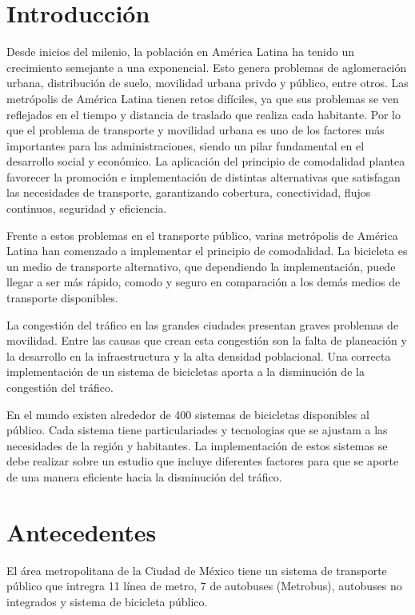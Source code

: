 \section{Introducción}

Desde inicios del milenio, la población en América Latina ha tenido un crecimiento semejante a una exponencial\cite{CEPAL_2015}. Esto genera problemas de aglomeración urbana, distribución de suelo, movilidad urbana privdo y público, entre otros. Las metrópolis de América Latina tienen retos difíciles, ya que sus problemas se ven reflejados en el tiempo y distancia de traslado que realiza cada habitante\cite{hall_1978}. Por lo que el problema de transporte y movilidad urbana es uno de los factores más importantes para las administraciones, siendo un pilar fundamental en el desarrollo social y económico. La aplicación del principio de comodalidad plantea favorecer la promoción e implementación de distintas alternativas que satisfagan las necesidades de transporte, garantizando cobertura, conectividad, flujos continuos, seguridad y eficiencia\cite{pastori_2018}.

Frente a estos problemas en el transporte público, varias metrópolis de América Latina han comenzado a implementar el principio de comodalidad. La bicicleta es un medio de transporte alternativo, que dependiendo la implementación, puede llegar a ser más rápido, comodo y seguro en comparación a los demás medios de transporte disponibles.

La congestión del tráfico en las grandes ciudades presentan graves problemas de movilidad. Entre las causas que crean esta congestión son la falta de planeación y la desarrollo en la infraestructura y la alta densidad poblacional. Una correcta implementación de un sistema de bicicletas aporta a la disminución de la congestión del tráfico.

En el mundo existen alrededor de 400 sistemas de bicicletas disponibles al público. Cada sistema tiene particulariades y tecnologias que se ajustam a las necesidades de la región y habitantes. La implementación de estos sistemas se debe realizar sobre un estudio que incluye diferentes factores para que se aporte de una manera eficiente hacia la disminución del tráfico.

\section{Antecedentes}

El área metropolitana de la Ciudad de México tiene un sistema de transporte público que intregra 11 línea de metro, 7 de autobuses (Metrobus), autobuses no integrados y sistema de bicicleta público.

